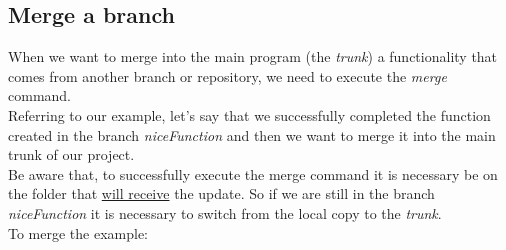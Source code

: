 \subsection{Merge a branch}
\label{subsection:shellMergeBranch}

When we want to merge into the main program (the \textit{trunk}) a functionality that comes from another branch or repository, we need to execute the \textit{merge} command.\\


Referring to our example, let's say that we successfully completed the function created in the branch \textit{niceFunction} and then we want to merge it into the main trunk of our project. \\

Be aware that, to successfully execute the merge command it is necessary be on the folder that \underline{will receive} the update. So if we are still in the branch \textit{niceFunction} it is necessary to switch from the local copy to the \textit{trunk}.\\

To merge the example:

